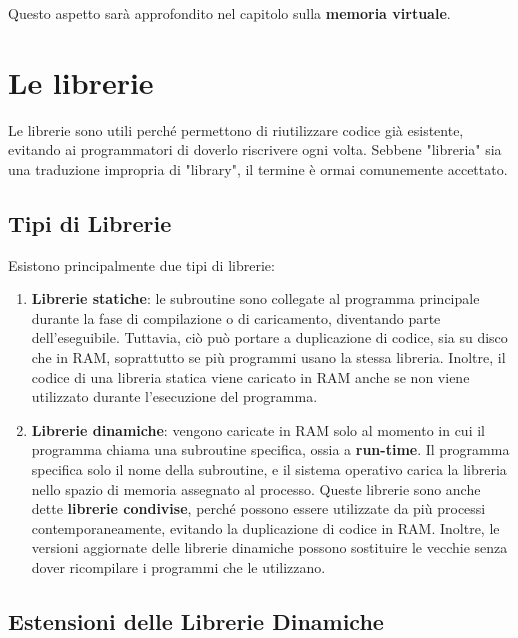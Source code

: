 Questo aspetto sarà approfondito nel capitolo sulla \textbf{memoria virtuale}.


\section{Le librerie}

Le librerie sono utili perché permettono di riutilizzare codice già esistente, evitando ai programmatori di doverlo riscrivere ogni volta. Sebbene "libreria" sia una traduzione impropria di "library", il termine è ormai comunemente accettato.

\subsection{Tipi di Librerie}

Esistono principalmente due tipi di librerie:

\begin{enumerate}
    \item \textbf{Librerie statiche}: le subroutine sono collegate al programma principale durante la fase di compilazione o di caricamento, diventando parte dell'eseguibile. Tuttavia, ciò può portare a duplicazione di codice, sia su disco che in RAM, soprattutto se più programmi usano la stessa libreria. Inoltre, il codice di una libreria statica viene caricato in RAM anche se non viene utilizzato durante l'esecuzione del programma.

    \item \textbf{Librerie dinamiche}: vengono caricate in RAM solo al momento in cui il programma chiama una subroutine specifica, ossia a \textbf{run-time}. Il programma specifica solo il nome della subroutine, e il sistema operativo carica la libreria nello spazio di memoria assegnato al processo. Queste librerie sono anche dette \textbf{librerie condivise}, perché possono essere utilizzate da più processi contemporaneamente, evitando la duplicazione di codice in RAM. Inoltre, le versioni aggiornate delle librerie dinamiche possono sostituire le vecchie senza dover ricompilare i programmi che le utilizzano.
\end{enumerate}

\subsection{Estensioni delle Librerie Dinamiche}

